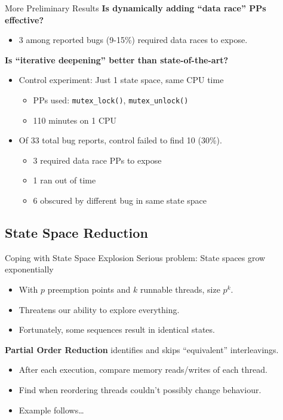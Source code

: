 \documentclass[xcolor=dvipsnames]{beamer}
\begin{document}
\begin{frame}{More Preliminary Results}
	\textbf{Is dynamically adding ``data race'' PPs effective?}
	\begin{itemize}
		\item 3 among reported bugs (9-15\%) required data races to expose.
	\end{itemize}
	\linegap

	{\bf Is ``iterative deepening'' better than state-of-the-art?}
	\begin{itemize}
		\item Control experiment: Just 1 state space, same CPU time
		\begin{itemize}
			\item PPs used: \texttt{mutex\_lock()}, \texttt{mutex\_unlock()}
			\item 110 minutes on 1 CPU
		\end{itemize}
		\item Of 33 total bug reports, control failed to find 10 (30\%).
		\begin{itemize}
			\item 3 required data race PPs to expose
			\item 1 ran out of time
			\item 6 obscured by different bug in same state space
		\end{itemize}
	\end{itemize}
\end{frame}

\subsection{State Space Reduction}

\begin{frame}{Coping with State Space Explosion}
	Serious problem: State spaces grow exponentially
	\begin{itemize}
		\item With $p$ preemption points and $k$ runnable threads, size $p^k$.
		\item Threatens our ability to explore everything.
		\item Fortunately, some sequences result in identical states.
	\end{itemize}
	\linegap

	{\bf Partial Order Reduction} identifies and skips ``equivalent'' interleavings.
	\begin{itemize}
		\item After each execution, compare memory reads/writes of each thread.
		\item Find when reordering threads couldn't possibly change behaviour.
		\item Example follows\dots
	\end{itemize}
\end{frame}
\end{document}
